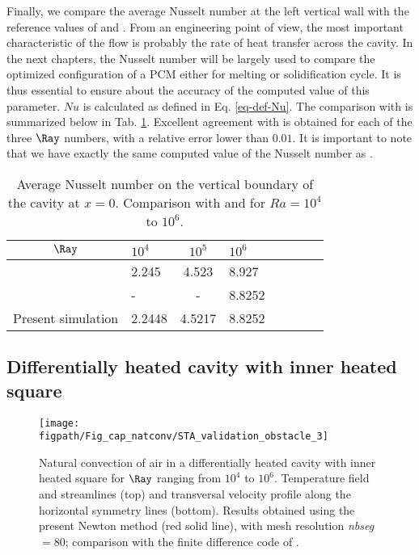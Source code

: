 Finally, we compare the average Nusselt number at the left vertical wall with the reference values of \cite{de1983natural} and \cite{LeQuere91}.
From an engineering point of view, the most important characteristic of the flow is probably the rate of heat  transfer across the cavity.
In the next chapters, the Nusselt number will be largely used to compare the optimized configuration of a PCM either for melting or solidification cycle.
It is thus essential to ensure about the accuracy of the computed value of this parameter.
$N\!u$ is calculated as defined in Eq. \ref{eq-def-Nu}.
The comparison with \cite{de1983natural} is summarized below in Tab. \ref{tab-Nu-natconv}.
Excellent agreement with \cite{de1983natural} is obtained for each of the three $\Ray$ numbers, with a relative error lower than $0.01$.
It is important to note that we have exactly the same computed value of the Nusselt number as \cite{LeQuere91}.
\begin{table}[!h]
   \begin{center}
      \begin{tabular}{*{4}{cl}}
         
       $\Ray$ & $10^4$ &$ 10^5$ & $10^6 $ \\
         \hline
        \cite{de1983natural} & 2.245 & 4.523  & 8.927 \\
        \cite{LeQuere91} & - & - &  8.8252 \\
        Present simulation & 2.2448 & 4.5217  & 8.8252 \\
      \end{tabular}
   \end{center}
   \caption{Average Nusselt number on the vertical boundary of the cavity at $x=0$. Comparison with \cite{de1983natural} and \cite{LeQuere91} for $Ra = 10^4$ to $10^6$.}
   \label{tab-Nu-natconv}
\end{table}


\subsection{Differentially heated cavity with inner heated square} \label{sub-2D-OBSTACLE}

\begin{figure}
	\begin{center}
		\texttt{[image: \\figpath/Fig\_cap\_natconv/STA\_validation\_obstacle\_3]} 
	\end{center}
	\caption{Natural convection of air in a differentially heated cavity with inner heated square for $\Ray$ ranging from $10^4$ to $10^6$. Temperature field and streamlines (top) and transversal velocity profile along the  horizontal symmetry lines (bottom). Results obtained using the present Newton method (red solid line), with mesh resolution {\em nbseg} $=80$; comparison with the finite difference code of \cite{Raluca2013}.}
	\label{fig-obst-2D}
\end{figure}

